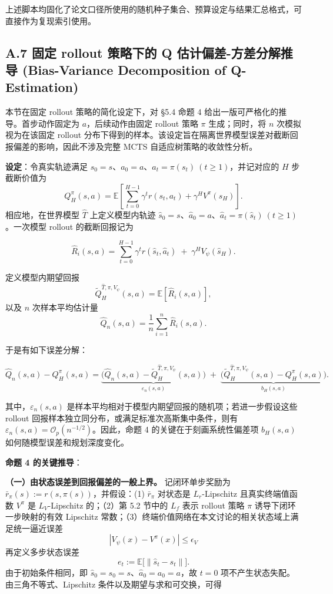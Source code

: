 \documentclass[UTF8]{ctexart}
\begin{document}
上述脚本均固化了论文口径所使用的随机种子集合、预算设定与结果汇总格式，可直接作为复现索引使用。

\hypertarget{a.7-q-ux4f30ux8ba1ux7684-bias-variance-ux5206ux89e3ux63a8ux5bfc-bias-variance-decomposition-of-q-estimation}{%
\subsection{A.7 固定 rollout 策略下的 Q 估计偏差-方差分解推导 (Bias-Variance
Decomposition of
Q-Estimation)}\label{a.7-q-ux4f30ux8ba1ux7684-bias-variance-ux5206ux89e3ux63a8ux5bfc-bias-variance-decomposition-of-q-estimation}}

本节在固定 rollout 策略的简化设定下，对 §5.4 命题 4 给出一版可严格化的推导。首步动作固定为 \(a\)，后续动作由固定 rollout 策略 \(\pi\) 生成；同时，将 \(n\) 次模拟视为在该固定 rollout 分布下得到的样本。该设定旨在隔离世界模型误差对截断回报偏差的影响，因此不涉及完整 MCTS 自适应树策略的收敛性分析。

\textbf{设定}：令真实轨迹满足 \(s_0=s\)、\(a_0=a\)、\(a_t=\pi(s_t)\ (t\ge1)\)，并记对应的 \(H\) 步截断价值为
\[
Q_H^\pi(s,a)
=
\mathbb E\!\left[
\sum_{t=0}^{H-1}\gamma^t r(s_t,a_t)+\gamma^H V^\pi(s_H)
\right].
\]
相应地，在世界模型 \(\hat T\) 上定义模型内轨迹 \(\hat s_0=s\)、\(\hat a_0=a\)、\(\hat a_t=\pi(\hat s_t)\ (t\ge1)\)。一次模型 rollout 的截断回报记为

\[
\hat{R}_i(s,a)
=
\sum_{t=0}^{H-1} \gamma^t r(\hat{s}_t,\hat{a}_t)
\;+\;
\gamma^H V_\psi(\hat{s}_H).
\]

定义模型内期望回报
\[
\tilde Q_H^{\hat T,\pi,V_\psi}(s,a)
=
\mathbb E[\hat R_i(s,a)],
\]
以及 \(n\) 次样本平均估计量
\[
\hat{Q}_n(s,a) = \frac{1}{n} \sum_{i=1}^n \hat{R}_i(s,a).
\]

于是有如下误差分解：

\[
\hat{Q}_n(s,a) - Q^\pi_H(s,a)
=
\underbrace{\bigl(\hat Q_n(s,a)-\tilde Q_H^{\hat T,\pi,V_\psi}(s,a)\bigr)}_{\varepsilon_n(s,a)}
\;+\;
\underbrace{\bigl(\tilde Q_H^{\hat T,\pi,V_\psi}(s,a)-Q_H^\pi(s,a)\bigr)}_{b_H(s,a)}.
\]

其中，\(\varepsilon_n(s,a)\) 是样本平均相对于模型内期望回报的随机项；若进一步假设这些 rollout 回报样本独立同分布，或满足标准次高斯集中条件，则有 \(\varepsilon_n(s,a)=\mathcal O_p(n^{-1/2})\)。因此，命题 4 的关键在于刻画系统性偏差项 \(b_H(s,a)\) 如何随模型误差和规划深度变化。

\textbf{命题 4 的关键推导}：

\textbf{（一）由状态误差到回报偏差的一般上界。} 记闭环单步奖励为 \(\bar r_\pi(s):=r(s,\pi(s))\)，并假设：(1) \(\bar r_\pi\) 对状态是 \(L_r\)-Lipschitz 且真实终端值函数 \(V^\pi\) 是 \(L_V\)-Lipschitz 的；（2）第 5.2 节中的 \(L_f\) 表示 rollout 策略 \(\pi\) 诱导下闭环一步映射的有效 Lipschitz 常数；（3）终端价值网络在本文讨论的相关状态域上满足统一逼近误差
\[
|V_\psi(x)-V^\pi(x)|\le \epsilon_V
\]
再定义多步状态误差
\[
e_t := \mathbb E\bigl[\|\hat s_t-s_t\|\bigr].
\]
由于初始条件相同，即 \(\hat s_0=s_0=s\)、\(\hat a_0=a_0=a\)，故 \(t=0\) 项不产生状态失配。由三角不等式、Lipschitz 条件以及期望与求和可交换，可得
\end{document}
